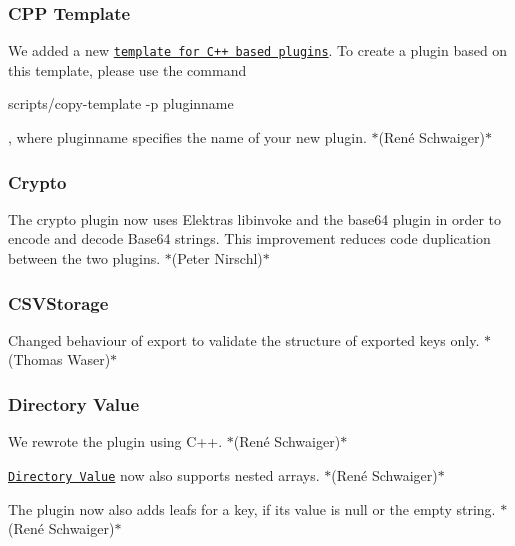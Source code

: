 \subsubsection*{C\+PP Template}


\begin{DoxyItemize}
\item We added a new \href{https://www.libelektra.org/plugins/cpptemplate}{\tt template for C++ based plugins}. To create a plugin based on this template, please use the command
\end{DoxyItemize}


\begin{DoxyCode}
scripts/copy-template -p pluginname
\end{DoxyCode}


, where {\ttfamily pluginname} specifies the name of your new plugin. $\ast$(René Schwaiger)$\ast$

\subsubsection*{Crypto}


\begin{DoxyItemize}
\item The {\ttfamily crypto} plugin now uses Elektra\textquotesingle{}s {\ttfamily libinvoke} and the {\ttfamily base64} plugin in order to encode and decode Base64 strings. This improvement reduces code duplication between the two plugins. $\ast$(Peter Nirschl)$\ast$
\end{DoxyItemize}

\subsubsection*{C\+S\+V\+Storage}


\begin{DoxyItemize}
\item Changed behaviour of export to validate the structure of exported keys only. $\ast$(Thomas Waser)$\ast$
\end{DoxyItemize}

\subsubsection*{Directory Value}


\begin{DoxyItemize}
\item We rewrote the plugin using C++. $\ast$(René Schwaiger)$\ast$
\item \href{https://www.libelektra.org/plugins/directoryvalue}{\tt Directory Value} now also supports nested arrays. $\ast$(René Schwaiger)$\ast$
\item The plugin now also adds leafs for a key, if its value is null or the empty string. $\ast$(René Schwaiger)$\ast$
\end{DoxyItemize}

